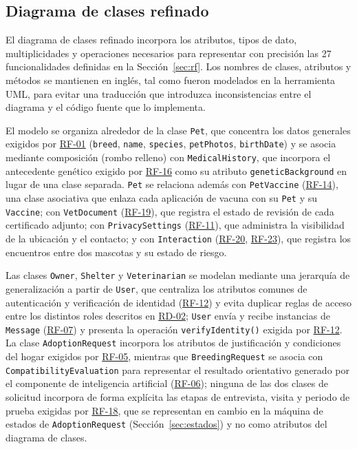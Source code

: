 \documentclass[journal,onecolumn]{IEEEtran}
\begin{document}
	\subsection{Diagrama de clases refinado}
	\label{sec:clases-refinado}

	El diagrama de clases refinado incorpora los atributos, tipos de dato,
	multiplicidades y operaciones necesarios para representar con precisión las
	27 funcionalidades definidas en la Sección~\ref{sec:rf}. Los nombres de
	clases, atributos y métodos se mantienen en inglés, tal como fueron
	modelados en la herramienta UML, para evitar una traducción que introduzca
	inconsistencias entre el diagrama y el código fuente que lo implementa.

	El modelo se organiza alrededor de la clase \texttt{Pet}, que concentra
	los datos generales exigidos por \hyperref[tab:RF-01]{RF-01} (\texttt{breed}, \texttt{name},
	\texttt{species}, \texttt{petPhotos}, \texttt{birthDate}) y se asocia
	mediante composición (rombo relleno) con \texttt{MedicalHistory}, que
	incorpora el antecedente genético exigido por \hyperref[tab:RF-16]{RF-16} como su atributo
	\texttt{geneticBackground} en lugar de una clase separada. \texttt{Pet} se
	relaciona además con \texttt{PetVaccine} (\hyperref[tab:RF-14]{RF-14}), una clase asociativa que
	enlaza cada aplicación de vacuna con su \texttt{Pet} y su
	\texttt{Vaccine}; con \texttt{VetDocument} (\hyperref[tab:RF-19]{RF-19}), que registra el estado
	de revisión de cada certificado adjunto; con \texttt{PrivacySettings}
	(\hyperref[tab:RF-11]{RF-11}), que administra la visibilidad de la ubicación y el contacto; y
	con \texttt{Interaction} (\hyperref[tab:RF-20]{RF-20}, \hyperref[tab:RF-23]{RF-23}), que registra los encuentros entre
	dos mascotas y su estado de riesgo.

	Las clases \texttt{Owner}, \texttt{Shelter} y \texttt{Veterinarian} se
	modelan mediante una jerarquía de generalización a partir de
	\texttt{User}, que centraliza los atributos comunes de autenticación y
	verificación de identidad (\hyperref[tab:RF-12]{RF-12}) y evita duplicar reglas de acceso entre
	los distintos roles descritos en \hyperref[tab:RD-02]{RD-02}; \texttt{User} envía y recibe
	instancias de \texttt{Message} (\hyperref[tab:RF-07]{RF-07}) y presenta la operación
	\texttt{verifyIdentity()} exigida por \hyperref[tab:RF-12]{RF-12}. La clase
	\texttt{AdoptionRequest} incorpora los atributos de justificación y
	condiciones del hogar exigidos por \hyperref[tab:RF-05]{RF-05}, mientras que
	\texttt{BreedingRequest} se asocia con \texttt{CompatibilityEvaluation}
	para representar el resultado orientativo generado por el componente de
	inteligencia artificial (\hyperref[tab:RF-06]{RF-06}); ninguna de las dos clases de solicitud
	incorpora de forma explícita las etapas de entrevista, visita y periodo de
	prueba exigidas por \hyperref[tab:RF-18]{RF-18}, que se representan en cambio en la máquina de
	estados de \texttt{AdoptionRequest} (Sección~\ref{sec:estados}) y no como
	atributos del diagrama de clases.
\end{document}
